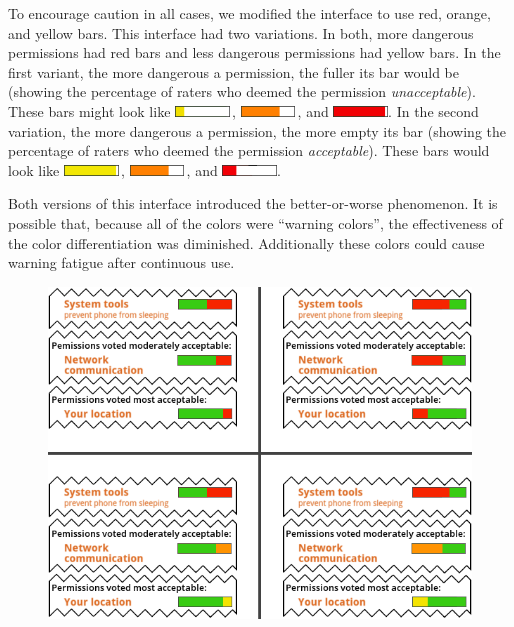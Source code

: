 \documentclass[11pt]{article}
\begin{document}
To encourage caution in all cases, we modified the interface to use 
red, orange, and yellow bars. This interface had 
two variations. In both, more dangerous permissions had red
bars and less dangerous permissions had yellow bars. In the first variant, the more 
dangerous a permission, the fuller its bar would be (showing the percentage of 
raters who deemed the permission \emph{unacceptable}). These bars might look like \includegraphics[height=8pt]{img/Bars3/RedBig/YellowWhiteBar.png}\,,
\includegraphics[height=8pt]{img/Bars3/RedBig/OrangeWhiteBar.png}\,, and 
\includegraphics[height=8pt]{img/Bars3/RedBig/RedWhiteBar.png}. In the second variation, the more
dangerous a permission, the more empty its bar (showing the percentage of raters who 
deemed the permission \emph{acceptable}). These bars would look like 
\includegraphics[height=8pt]{img/Bars3/RedSmall/YellowWhiteBar.png}\,,
\includegraphics[height=8pt]{img/Bars3/RedSmall/OrangeWhiteBar.png}\,, and
\includegraphics[height=8pt]{img/Bars3/RedSmall/RedWhiteBar.png}.

Both versions of this interface introduced the 
better-or-worse phenomenon. It is possible that,
because all of the colors were ``warning colors'', the effectiveness of the color 
differentiation was diminished. Additionally
these colors could cause warning fatigue after continuous use.


\begin{figure}
\begin{center}
\includegraphics[width=.9\linewidth]{candidate-img/bars/barsR4.png}
\end{center}
\end{figure}
\end{document}
